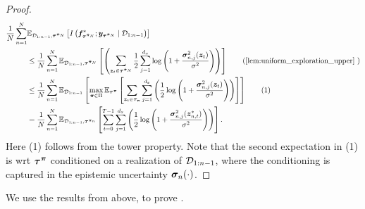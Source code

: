 \begin{proof}
    \begin{align*}
        \frac{1}{N}\sum^{N}_{n=1} &\E_{\setD_{1:n-1}, \vtau^{\Bar{\vpi}_N}}\left[I\left(\vf^*_{\vtau^{\Bar{\vpi}_N}}; \vy_{\vtau^{\Bar{\vpi}_N}} \mid \setD_{1:n-1}\right)\right] \\&\leq \frac{1}{N} \sum^{N}_{n=1} \E_{\setD_{1:n-1}, \vtau^{\Bar{\vpi}_N}}\left[  \left(\sum_{\vz_t \in \vtau^{\Bar{\vpi}_N}} \frac{1}{2} \sum_{j=1}^{d_x}  \log \left(1 + \frac{\vsigma_{n, j}^2(\vz_{t})}{\sigma^2}\right) \right)\right] \tag{\Cref{lem:uniform_exploration_upper} }\\
        &\leq \frac{1}{N}  \sum^{N}_{n=1} \E_{\setD_{1:n-1}}\left[ \max_{\vpi \in \Pi} \E_{ \vtau^{\vpi}}\left[ \sum_{\vz_t \in \vtau_{\vpi}} \sum_{j=1}^{d_x}  \left(\frac{1}{2} \log \left(1 + \frac{\vsigma_{n, j}^2(\vz_{t})}{\sigma^2}\right)\right)\right]\right] \tag{1}\\
        &= \frac{1}{N}  \sum^{N}_{n=1} \E_{\setD_{1:n-1}, \vtau^{\vpi_n}}\left[\sum_{t=0}^{T-1} \sum_{j=1}^{d_x} \left( \frac{1}{2}\log \left(1 + \frac{\vsigma_{n, j}^2(\vz^*_{n, t})}{\sigma^2}\right) \right)\right].
    \end{align*}
    Here (1) follows from the tower property. Note that the second expectation in (1) is wrt ${\bm{\tau}}^{{\bm{\pi}}}$ conditioned on a realization of ${\mathcal{D}}_{1:n-1}$, where the conditioning is captured in the epistemic uncertainty ${\bm{\sigma}}_n(\cdot)$.
\end{proof}
We use the results from above, to prove .
